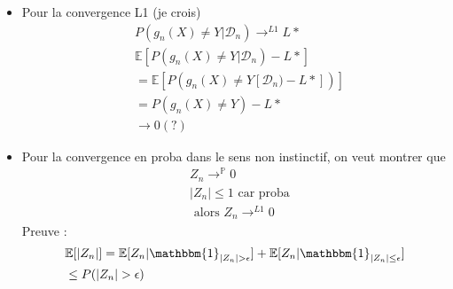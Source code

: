\documentclass{article}
\theoremstyle{plain}%
\theoremstyle{definition}
\theoremstyle{remark}
\begin{document}
\begin{itemize}
    \item Pour la convergence L1 (je crois)
    \begin{align*}
        &P(g_n(X) \neq Y | \mathcal{D}_n) \to ^{L1} L* \\
        &\mathbb{E}[ P(g_n (X) \neq  Y | \mathcal{D} _n) - L*] \\
        &= \mathbb{E} [ P(g_n(X) \neq Y [ \mathcal{D}_n ) - L*])] \\
        &= P(g_n(X) \neq Y ) - L* \\
        & \to 0 (?)
    \end{align*}
    \item Pour la convergence en proba dans le sens non instinctif, on veut montrer que
    \begin{align*}
        &Z_n \to ^{\mathbb{P}} 0 \\
        &\left| Z_n \right|  \leq 1 \text{ car proba} \\
        &\text{ alors } Z_n \to ^{L1} 0
    \end{align*}
    Preuve : \begin{align*}
        &\mathbb{E} [ \left| Z_n \right| ] = \mathbb{E} [ Z_n  | \mathbbm{1}_{\left| Z_n \right| > \epsilon  }] + \mathbb{E} [ Z_n | \mathbbm{1}_{\left| Z_n \right| \leq \epsilon }] \\
        &\leq P(\left| Z_n \right| > \epsilon )
    \end{align*}
\end{itemize}
\end{document}
